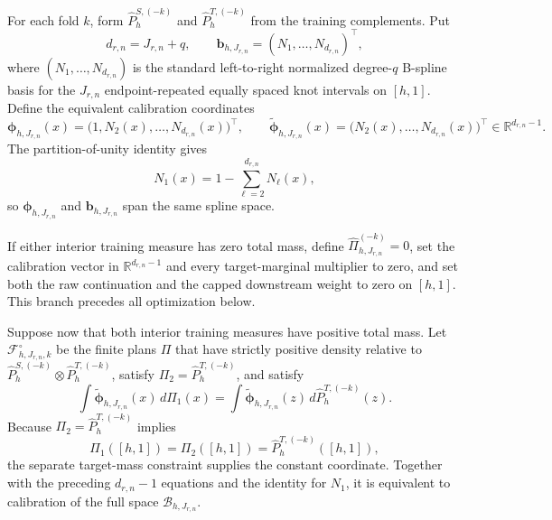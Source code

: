 For each fold \(k\), form \(\widehat P^{S,(-k)}_h\) and \(\widehat P^{T,(-k)}_h\) from the training complements. Put
\[
d_{r,n}=J_{r,n}+q,
\qquad
\mathbf b_{h,J_{r,n}}=(N_1,\ldots,N_{d_{r,n}})^\top,
\]
where \((N_1,\ldots,N_{d_{r,n}})\) is the standard left-to-right normalized degree-\(q\) B-spline basis for the \(J_{r,n}\) endpoint-repeated equally spaced knot intervals on \([h,1]\). Define the equivalent calibration coordinates
\[
\boldsymbol\phi_{h,J_{r,n}}(x)=\bigl(1,N_2(x),\ldots,N_{d_{r,n}}(x)\bigr)^\top,
\qquad
\widetilde{\boldsymbol\phi}_{h,J_{r,n}}(x)=\bigl(N_2(x),\ldots,N_{d_{r,n}}(x)\bigr)^\top
\in\mathbb R^{d_{r,n}-1}.
\]
The partition-of-unity identity gives
\[
N_1(x)=1-\sum_{\ell=2}^{d_{r,n}}N_\ell(x),
\]
so \(\boldsymbol\phi_{h,J_{r,n}}\) and \(\mathbf b_{h,J_{r,n}}\) span the same spline space.

If either interior training measure has zero total mass, define \(\widehat\Pi^{(-k)}_{h,J_{r,n}}=0\), set the calibration vector in \(\mathbb R^{d_{r,n}-1}\) and every target-marginal multiplier to zero, and set both the raw continuation and the capped downstream weight to zero on \([h,1]\). This branch precedes all optimization below.

Suppose now that both interior training measures have positive total mass. Let \(\mathcal F^\circ_{h,J_{r,n},k}\) be the finite plans \(\Pi\) that have strictly positive density relative to \(\widehat P^{S,(-k)}_h\otimes\widehat P^{T,(-k)}_h\), satisfy \(\Pi_2=\widehat P^{T,(-k)}_h\), and satisfy
\[
\int\widetilde{\boldsymbol\phi}_{h,J_{r,n}}(x)\,d\Pi_1(x)
=\int\widetilde{\boldsymbol\phi}_{h,J_{r,n}}(z)\,d\widehat P^{T,(-k)}_h(z).
\]
Because \(\Pi_2=\widehat P^{T,(-k)}_h\) implies
\[
\Pi_1([h,1])=\Pi_2([h,1])=\widehat P^{T,(-k)}_h([h,1]),
\]
the separate target-mass constraint supplies the constant coordinate. Together with the preceding \(d_{r,n}-1\) equations and the identity for \(N_1\), it is equivalent to calibration of the full space \(\mathcal B_{h,J_{r,n}}\).

